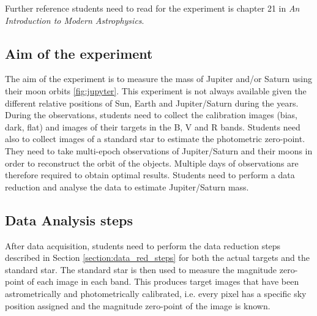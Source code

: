 \documentclass[a4paper, 11pt, fleqn]{memoir}
\begin{document}
Further reference students need to read for the experiment is chapter 21 in \emph{An Introduction to Modern Astrophysics}\autocite{carroll2017introduction}.

\subsection{Aim of the experiment}

The aim of the experiment is to measure the mass of Jupiter and/or Saturn using their moon orbits \ref{fig:jupyter}.
This experiment is not always available given the different relative positions of Sun, Earth and Jupiter/Saturn during the years.
During the observations, students need to collect the calibration images (bias, dark, flat) and images of their targets in the B, V and R bands.
Students need also to collect images of a standard star to estimate the photometric zero-point.
They need to take multi-epoch observations of Jupiter/Saturn and their moons in order to reconstruct the orbit of the objects.
Multiple days of observations are therefore required to obtain optimal results.
Students need to perform a data reduction and analyse the data to estimate Jupiter/Saturn mass.

\subsection{Data Analysis steps}

After data acquisition, students need to perform the data reduction steps described in Section \ref{section:data_red_steps} for both the actual targets and the standard star.
The standard star is then used to measure the magnitude zero-point of each image in each band.
This produces target images that have been astrometrically and photometrically calibrated, i.e. every pixel has a specific sky position assigned and the magnitude zero-point of the image is known.
\end{document}
